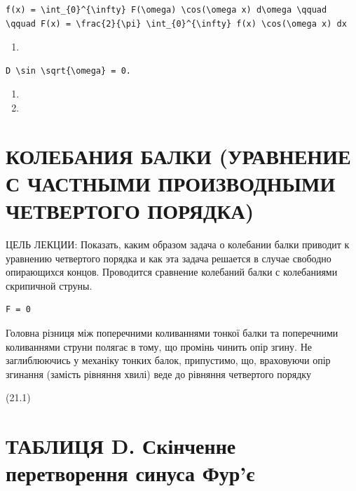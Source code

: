 \documentclass[
  ukrainian,
]{article}
\providecommand{\tightlist}{%
  \setlength{\itemsep}{0pt}\setlength{\parskip}{0pt}}
\begin{document}
\begin{verbatim}
f(x) = \int_{0}^{\infty} F(\omega) \cos(\omega x) d\omega \qquad \qquad F(x) = \frac{2}{\pi} \int_{0}^{\infty} f(x) \cos(\omega x) dx
\end{verbatim}

\begin{enumerate}
\def\labelenumi{\arabic{enumi}.}
\setcounter{enumi}{18}
\tightlist
\item
\end{enumerate}

\begin{verbatim}
D \sin \sqrt{\omega} = 0.
\end{verbatim}

\begin{enumerate}
\def\labelenumi{\arabic{enumi}.}
\setcounter{enumi}{18}
\tightlist
\item
\item
\end{enumerate}

\section{КОЛЕБАНИЯ БАЛКИ (УРАВНЕНИЕ С ЧАСТНЫМИ ПРОИЗВОДНЫМИ ЧЕТВЕРТОГО
ПОРЯДКА)}\label{ux43aux43eux43bux435ux431ux430ux43dux438ux44f-ux431ux430ux43bux43aux438-ux443ux440ux430ux432ux43dux435ux43dux438ux435-ux441-ux447ux430ux441ux442ux43dux44bux43cux438-ux43fux440ux43eux438ux437ux432ux43eux434ux43dux44bux43cux438-ux447ux435ux442ux432ux435ux440ux442ux43eux433ux43e-ux43fux43eux440ux44fux434ux43aux430}

ЦЕЛЬ ЛЕКЦИИ: Показать, каким образом задача о колебании балки приводит к
уравнению четвертого порядка и как эта задача решается в случае свободно
опирающихся концов. Проводится сравнение колебаний балки с колебаниями
скрипичной струны.

\begin{verbatim}
F = 0
\end{verbatim}

Головна різниця між поперечними коливаннями тонкої балки та поперечними
коливаннями струни полягає в тому, що промінь чинить опір згину. Не
заглиблюючись у механіку тонких балок, припустимо, що, враховуючи опір
згинання (замість рівняння хвилі) веде до рівняння четвертого порядку

(21.1)

\section{ТАБЛИЦЯ D. Скінченне перетворення синуса
Фур'є}\label{ux442ux430ux431ux43bux438ux446ux44f-d.-ux441ux43aux456ux43dux447ux435ux43dux43dux435-ux43fux435ux440ux435ux442ux432ux43eux440ux435ux43dux43dux44f-ux441ux438ux43dux443ux441ux430-ux444ux443ux440ux454}
\end{document}
